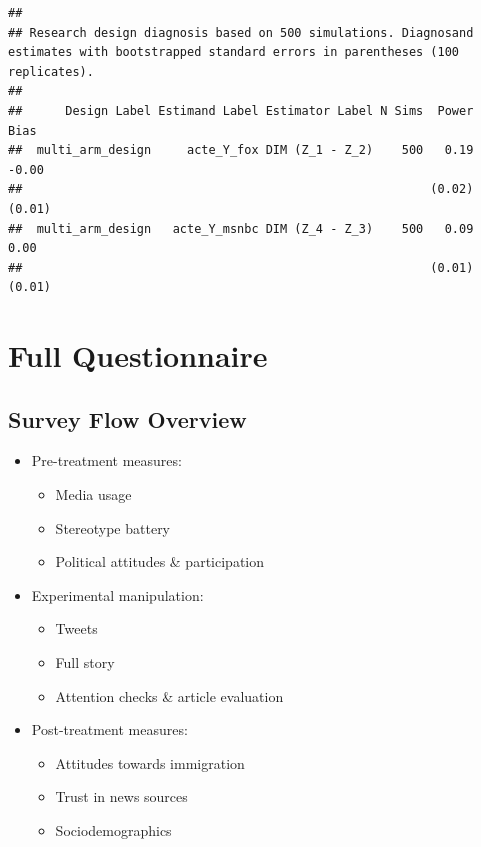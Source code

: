 \documentclass[]{article}
\providecommand{\tightlist}{%
  \setlength{\itemsep}{0pt}\setlength{\parskip}{0pt}}
\begin{document}
\begin{verbatim}
## 
## Research design diagnosis based on 500 simulations. Diagnosand estimates with bootstrapped standard errors in parentheses (100 replicates).
## 
##      Design Label Estimand Label Estimator Label N Sims  Power   Bias
##  multi_arm_design     acte_Y_fox DIM (Z_1 - Z_2)    500   0.19  -0.00
##                                                         (0.02) (0.01)
##  multi_arm_design   acte_Y_msnbc DIM (Z_4 - Z_3)    500   0.09   0.00
##                                                         (0.01) (0.01)
\end{verbatim}

\hypertarget{full-questionnaire}{%
\section{Full Questionnaire}\label{full-questionnaire}}

\hypertarget{survey-flow-overview}{%
\subsection{Survey Flow Overview}\label{survey-flow-overview}}

\begin{itemize}
\tightlist
\item
  Pre-treatment measures:

  \begin{itemize}
  \tightlist
  \item
    Media usage
  \item
    Stereotype battery
  \item
    Political attitudes \& participation
  \end{itemize}
\item
  Experimental manipulation:

  \begin{itemize}
  \tightlist
  \item
    Tweets
  \item
    Full story
  \item
    Attention checks \& article evaluation
  \end{itemize}
\item
  Post-treatment measures:

  \begin{itemize}
  \tightlist
  \item
    Attitudes towards immigration
  \item
    Trust in news sources
  \item
    Sociodemographics
  \end{itemize}
\end{itemize}
\end{document}
